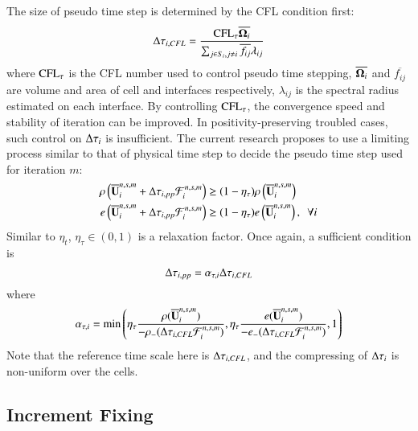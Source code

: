 \documentclass[preprint,12pt]{elsarticle}
\begin{document}
The size of pseudo time step is determined
by the CFL condition first:
\begin{equation}
    \mathrm\Delta \tau_{i,CFL} = \frac{\text{CFL}_\tau \overline{\mathbf{\Omega}_i} }
    {\sum_{j\in S_i, j\neq i}{\overline{f_{ij}}\lambda_{ij}}}
\end{equation}
where $\text{CFL}_\tau$ is the CFL number used to control
pseudo time stepping, $\overline{\mathbf{\Omega}_i}$ and $\overline{f_{ij}}$ 
are volume and area of cell and interfaces respectively, 
$\lambda_{ij}$ is the spectral radius estimated on each interface.
By controlling $\text{CFL}_\tau$, the convergence speed and 
stability of iteration can be improved. 
In positivity-preserving troubled cases, 
such control on $\mathrm\Delta \tau_i$ is insufficient.
The current research proposes to use a limiting 
process similar to that of physical time step 
to decide the pseudo time step used for 
iteration $m$:
\begin{equation}
    \label{eq:ppLimitDtau}
    \begin{aligned}
        \rho\left(\overline{\mathbf{U}}_i^{n,s,m} + \mathrm\Delta \tau_{i, pp}\mathcal{F}_i^{n,s,m}\right)
         & \geq
        (1- \eta_\tau)
        \rho\left(\overline{\mathbf{U}}_i^{n,s,m}\right) \\
        e\left(\overline{\mathbf{U}}_i^{n,s,m} + \mathrm\Delta \tau_{i, pp}\mathcal{F}_i^{n,s,m}\right)
         & \geq
        (1- \eta_\tau)
        e\left(\overline{\mathbf{U}}_i^{n,s,m}\right), \ \ \forall i
    \end{aligned}
\end{equation}
Similar to $\eta_t$, $\eta_\tau\in(0,1)$ is a relaxation factor. 
Once again, a sufficient condition is
\begin{equation}
    \mathrm\Delta\tau_{i,pp} =  \alpha_{\tau,i} \mathrm\Delta\tau_{i,CFL}
\end{equation}
where
\begin{equation}
    \alpha_{\tau,i} = \min\left(
        \eta_\tau\frac{\rho(\overline{\mathbf{U}}_i^{n,s,m})}{-\rho_-(\mathrm\Delta\tau_{i,CFL} \mathcal{F}_i^{n,s,m})},
        \eta_\tau\frac{e(\overline{\mathbf{U}}_i^{n,s,m})}{-e_-(\mathrm\Delta\tau_{i,CFL} \mathcal{F}_i^{n,s,m})},
        1
        \right)
\end{equation}
Note that the reference time scale here is $\mathrm\Delta\tau_{i,CFL}$, 
and the compressing of $\mathrm\Delta\tau_i$ is non-uniform over the cells.

\subsection{Increment Fixing}
\end{document}

